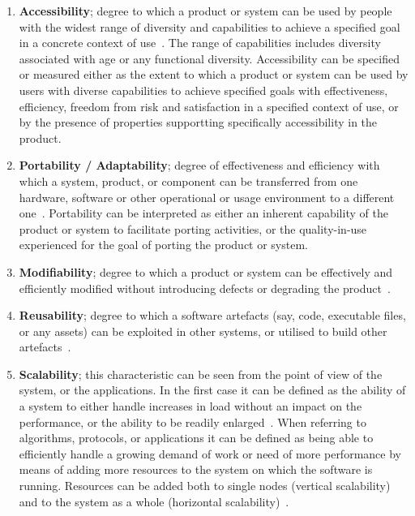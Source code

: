 \begin{enumerate}
    \item \textbf{Accessibility}; degree to which a product or system can be used by people with the widest range of diversity and capabilities to achieve a specified goal in a concrete context of use~\cite{iso_25010_2011_2017}. The range of capabilities includes diversity associated with age or any functional diversity. Accessibility can be specified or measured either as the extent to which a product or system can be used by users with diverse capabilities to achieve specified goals with effectiveness, efficiency, freedom from risk and satisfaction in a specified context of use, or by the presence of properties supportting specifically accessibility in the product.

    \item \textbf{Portability / Adaptability}; degree of effectiveness and efficiency with which a system, product, or component can be transferred from one hardware, software or other operational or usage environment to a different one~\cite{iso_25010_2011_2017}. Portability can be interpreted as either an inherent capability of the product or system to facilitate porting activities, or the quality-in-use experienced for the goal of porting the product or system.

    \item \textbf{Modifiability}; degree to which a product or system can be effectively and efficiently modified without introducing defects or degrading the product~\cite{iso_25010_2011_2017}.

    \item \textbf{Reusability}; degree to which a software artefacts (say, code, executable files, or any assets) can be exploited in other systems, or utilised to build other artefacts~\cite{iso_25010_2011_2017}.

    \item \textbf{Scalability}; this characteristic can be seen from the point of view of the system, or the applications. In the first case it can be defined as the ability of a system to either handle increases in load without an impact on the performance, or the ability to be readily enlarged~\cite{microsoft_2010}. When referring to algorithms, protocols, or applications it can be defined as being able to efficiently handle a growing demand of work or need of more performance by means of adding more resources to the system on which the software is running. Resources can be added both to single nodes (vertical scalability) and to the system as a whole (horizontal scalability)~\cite{bondi_2000}.


\end{enumerate}
